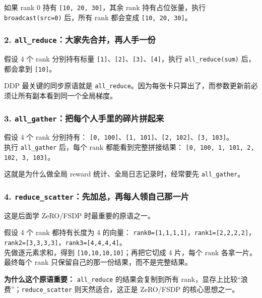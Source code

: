 如果 rank 0 持有 \texttt{[10, 20, 30]}，其余 rank 持有占位张量，执行 \texttt{broadcast(src=0)} 后，所有 rank 都会变成 \texttt{[10, 20, 30]}。

\subsubsection*{2. \texttt{all\_reduce}：大家先合并，再人手一份}

假设 4 个 rank 分别持有标量 \texttt{[1]}、\texttt{[2]}、\texttt{[3]}、\texttt{[4]}，执行 \texttt{all\_reduce(sum)} 后， 都会拿到 \texttt{[10]}。

\begin{warnbox}
DDP 最关键的同步原语就是 \texttt{all\_reduce}。因为每张卡只算出了，而参数更新前必须让所有副本看到同一个全局梯度。
\end{warnbox}

\subsubsection*{3. \texttt{all\_gather}：把每个人手里的碎片拼起来}

假设 4 个 rank 分别持有：
\texttt{[0, 100]}、\texttt{[1, 101]}、\texttt{[2, 102]}、\texttt{[3, 103]}。\\
执行 \texttt{all\_gather} 后，每个 rank 都能看到完整拼接结果：
\texttt{[0, 100, 1, 101, 2, 102, 3, 103]}。

这就是为什么做全局 reward 统计、全局日志记录时，经常要先 \texttt{all\_gather}。

\subsubsection*{4. \texttt{reduce\_scatter}：先加总，再每人领自己那一片}

这是后面学 ZeRO/FSDP 时最重要的原语之一。

假设 4 个 rank 都持有长度为 4 的向量：
\texttt{rank0=[1,1,1,1]}，\texttt{rank1=[2,2,2,2]}，\texttt{rank2=[3,3,3,3]}，\texttt{rank3=[4,4,4,4]}。\\
先做逐元素求和，得到 \texttt{[10,10,10,10]}；再把它切成 4 片，每个 rank 各拿一片。\\
最终每个 rank 只保留自己的那一份结果，而不是完整结果。

\begin{intubox}
\textbf{为什么这个原语重要：} \texttt{all\_reduce} 的结果会复制到所有 rank，显存上比较“浪费”；\texttt{reduce\_scatter} 则天然适合，这正是 ZeRO/FSDP 的核心思想之一。
\end{intubox}


